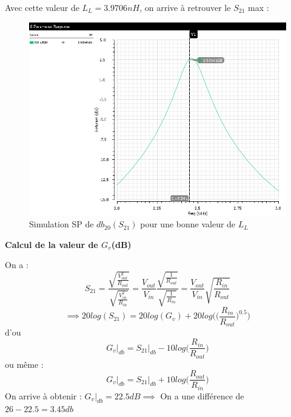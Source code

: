 \documentclass[a4paper]{article}
\begin{document}
\clearpage

Avec cette valeur de $L_L = 3.9706 nH$, on arrive \`a retrouver le $S_{21}$ max :

\begin{figure}[!htb]
\begin{center}
  \includegraphics[scale=0.45]{Q4-S21db20-newL_l.png}
  \caption{Simulation SP de $db_{20} (S_{21})$ pour une bonne valeur de $L_L$}
  \label{s21-sp-sim-newll}
\end{center}
\end{figure}

\textbf{Calcul de la valeur de $G_v$(dB)}

On a :
\[
  S_{21} = \frac{
    \sqrt{
      \frac{V^2_{out}}{R_{out}}
    }
  }
  {
    \sqrt{
    \frac{V^2_{in}}{R_{in}}
    }
  }
  = \frac{V_{out}}{V_{in}} \frac{\sqrt{\frac{1}{R_{out}}}}{ \sqrt{\frac{1}{R_{in}} } } = \frac{V_{out}}{V_{in}} \sqrt{\frac{R_{in}}{R_{out}} }
\]
\[
\implies 20log(S_{21}) = 20 log(G_v) + 20 log \bigg( \bigg(\frac{R_{in}}{R_{out}}\bigg)^{0.5}\bigg)
\]
d'ou
\[
G_v\big|_{db} = S_{21}\big|_{db} - 10 log \bigg(\frac{R_{in}}{R_{out}}\bigg)
\]
ou m\^eme :
\[
G_v\big|_{db} = S_{21}\big|_{db} + 10 log \bigg(\frac{R_{out}}{R_{in}}\bigg)
\]
On arrive \`a obtenir : $G_v\big|_{db} = 22.5 dB \implies$ On a une diff\'erence de $26 - 22.5 = 3.45 db$
\end{document}
